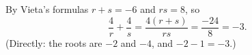 By Vieta's formulas $r+s=-6$ and $rs=8$, so
\[
\dfrac{4}{r}+\dfrac{4}{s}=\dfrac{4(r+s)}{rs}=\dfrac{-24}{8}=\boxed{-3}.
\]
(Directly: the roots are $-2$ and $-4$, and $-2-1=-3$.)
